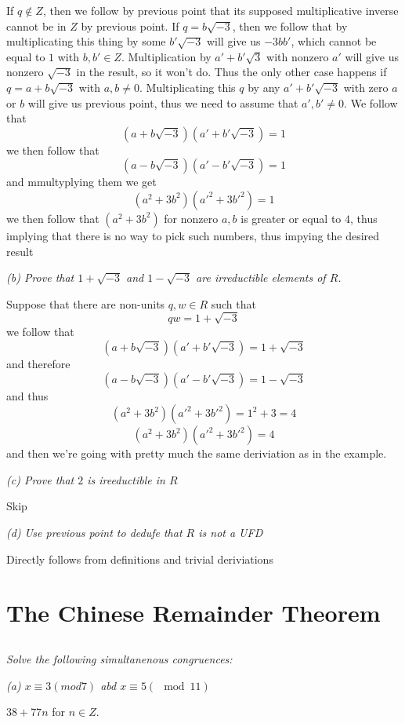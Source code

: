 \documentclass[11pt,oneside,titlepage]{book}
\begin{document}
If $q \notin Z$, then we follow by previous point that its supposed
multiplicative inverse cannot be in $Z$ by previous point. If $q =
b\sqrt{-3}$, then we follow that by multiplicating this thing by some
$b'\sqrt{-3}$ will give us $-3bb'$, which cannot be equal to $1$ with
$b, b' \in Z$. Multiplication by $a' + b'\sqrt{3}$ with nonzero $a'$
will give us nonzero $\sqrt{-3}$ in the result, so it won't do. Thus
the only other case happens if $q = a + b\sqrt{-3}$ with $a, b \neq
0$. Multiplicating this $q$ by any $a' + b'\sqrt{-3}$ with zero $a$ or
$b$ will give us previous point, thus we need to assume that $a', b'
\neq 0$. We follow that
$$(a + b\sqrt{-3})(a' + b'\sqrt{-3}) = 1$$
we then follow that
$$(a - b\sqrt{-3})(a' - b'\sqrt{-3}) = 1$$
and mmultyplying them we get
$$(a^2 + 3b^2)(a'^2 + 3b'^2) = 1$$
we then follow that $(a^2 + 3b^2)$ for nonzero $a, b$ is greater or
equal to $4$, thus implying that there is no way to pick such numbers,
thus impying the desired result


\textit{(b) Prove that $1 + \sqrt{-3}$ and $1 - \sqrt{-3}$ are
  irreductible elements of $R$.}

Suppose that there are non-units $q, w \in R$ such that
$$qw = 1 + \sqrt{-3}$$
we follow that
$$(a + b\sqrt{-3})(a' + b'\sqrt{-3}) = 1 + \sqrt{-3}$$
and therefore
$$(a - b\sqrt{-3})(a' - b'\sqrt{-3}) = 1 - \sqrt{-3}$$
and thus
$$(a^2 + 3b^2)(a'^2 + 3b'^2) = 1^2 + 3 = 4$$
$$(a^2 + 3b^2)(a'^2 + 3b'^2) = 4$$
and then we're going with pretty much the same deriviation as in the
example.

\textit{(c) Prove that $2$ is ireeductible in $R$}

Skip

\textit{(d) Use previous point to dedufe that $R$ is not a UFD}

Directly follows from definitions and trivial deriviations

\section{The Chinese Remainder Theorem}

\subsection{}

\textit{Solve the following simultanenous congruences:}

\textit{(a) $x \equiv 3(mod 7)$ abd $x \equiv 5 (\mod 11)$}

$38 + 77n $ for $n \in Z$.
\end{document}
